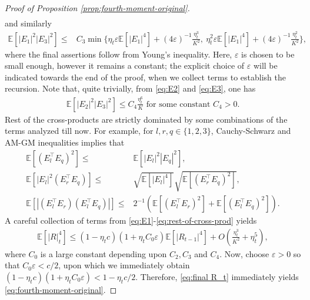 \documentclass[10pt,a4paper]{amsart}
\def\IE{\mathbb{E}}
\begin{document}
\begin{proof}[Proof of Proposition \ref{prop:fourth-moment-original}]
\begin{align}
\end{align}
and similarly
\begin{align}
    \IE[|E_1|^2 |E_3|^2] \leq & C_3 \min\{\eta_t \varepsilon \IE[|E_1|^4] + (4\varepsilon)^{-1} \frac{\eta_t^3}{K^2} , \  \eta_t^2 \varepsilon \IE[|E_1|^4] + (4\varepsilon)^{-1} \frac{\eta_t^2}{K^2} \}, \label{eq:E1-cross-prods-2}
\end{align}
where the final assertions follow from Young's inequality. Here, $\varepsilon$ is chosen to be small enough, however it remains a constant; the explicit choice of $\varepsilon$ will be indicated towards the end of the proof, when we collect terms to establish the recursion. Note that, quite trivially, from \eqref{eq:E2} and \eqref{eq:E3}, one has
\begin{align}
    \IE[|E_2|^2 |E_3|^2] \leq C_4\frac{\eta_t^6}{K} \text{ for some constant $C_4>0$}. \label{eq:E2-E3}
\end{align}
Rest of the cross-products are strictly dominated by some combinations of the terms analyzed till now. For example, for $l,r, q \in \{1,2,3\}$, Cauchy-Schwarz and AM-GM inequalities implies that
\begin{align}
  \IE[(E_l^\top E_q)^2] \leq & \IE[|E_l|^2 |E_q|^2], \nonumber\\
    \IE[|E_l|^2 (E_r^\top E_q) ] \leq & \sqrt{\IE[|E_l|^4]} \sqrt{\IE[(E_r^\top E_q)^2]}, \nonumber\\
    \IE[|(E_l^\top E_r) (E_l^\top E_q)|] \leq & 2^{-1}(\IE[(E_l^\top E_r)^2] + \IE[(E_l^\top E_q)^2]) \label{eq:rest-of-cross-prod}.
\end{align}
A careful collection of terms from \eqref{eq:E1}-\eqref{eq:rest-of-cross-prod} yields
\begin{align}
    \IE[|R|_t^4]\leq (1-\eta_tc) (1+ \eta_t C_0 \varepsilon)\IE[|R_{t-1}|^4] + O(\frac{\eta_t^3}{K^2} + \eta_t^5),\label{eq:final R_t}
\end{align}
where $C_0$ is a large constant depending upon $C_2, C_3$ and $C_4$. Now, choose $\varepsilon>0$ so that $C_0\varepsilon < c/2$, upon which we immediately obtain $(1-\eta_tc) (1+ \eta_t C_0 \varepsilon)< 1- \eta_t c/2$. Therefore, \eqref{eq:final R_t} immediately yields \eqref{eq:fourth-moment-original}. 
\end{proof}
\end{document}
